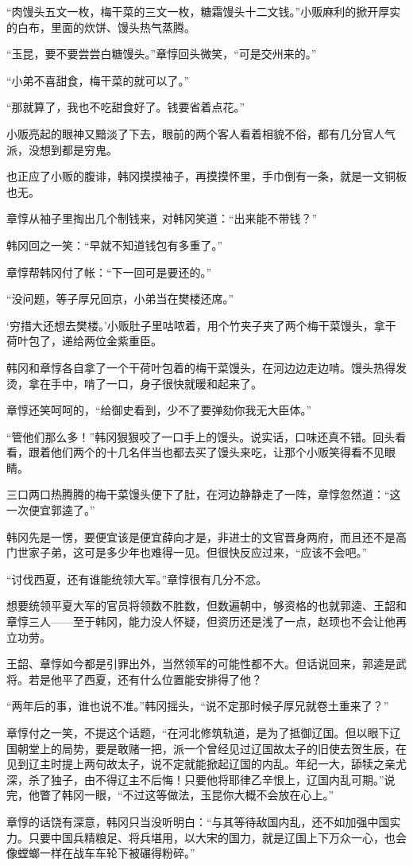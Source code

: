 “肉馒头五文一枚，梅干菜的三文一枚，糖霜馒头十二文钱。”小贩麻利的掀开厚实的白布，里面的炊饼、馒头热气蒸腾。

“玉昆，要不要尝尝白糖馒头。”章惇回头微笑，“可是交州来的。”

“小弟不喜甜食，梅干菜的就可以了。”

“那就算了，我也不吃甜食好了。钱要省着点花。”

小贩亮起的眼神又黯淡了下去，眼前的两个客人看着相貌不俗，都有几分官人气派，没想到都是穷鬼。

也正应了小贩的腹诽，韩冈摸摸袖子，再摸摸怀里，手巾倒有一条，就是一文铜板也无。

章惇从袖子里掏出几个制钱来，对韩冈笑道：“出来能不带钱？”

韩冈回之一笑：“早就不知道钱包有多重了。”

章惇帮韩冈付了帐：“下一回可是要还的。”

“没问题，等子厚兄回京，小弟当在樊楼还席。”

‘穷措大还想去樊楼。’小贩肚子里咕哝着，用个竹夹子夹了两个梅干菜馒头，拿干荷叶包了，递给两位金紫重臣。

韩冈和章惇各自拿了一个干荷叶包着的梅干菜馒头，在河边边走边啃。馒头热得发烫，拿在手中，啃了一口，身子很快就暖和起来了。

章惇还笑呵呵的，“给御史看到，少不了要弹劾你我无大臣体。”

“管他们那么多！”韩冈狠狠咬了一口手上的馒头。说实话，口味还真不错。回头看看，跟着他们两个的十几名伴当也都去买了馒头来吃，让那个小贩笑得看不见眼睛。

三口两口热腾腾的梅干菜馒头便下了肚，在河边静静走了一阵，章惇忽然道：“这一次便宜郭逵了。”

韩冈先是一愣，要便宜该是便宜薛向才是，非进士的文官晋身两府，而且还不是高门世家子弟，这可是多少年也难得一见。但很快反应过来，“应该不会吧。”

“讨伐西夏，还有谁能统领大军。”章惇很有几分不忿。

想要统领平夏大军的官员将领数不胜数，但数遍朝中，够资格的也就郭逵、王韶和章惇三人——至于韩冈，能力没人怀疑，但资历还是浅了一点，赵顼也不会让他再立功劳。

王韶、章惇如今都是引罪出外，当然领军的可能性都不大。但话说回来，郭逵是武将。若是他平了西夏，还有什么位置能安排得了他？

“两年后的事，谁也说不准。”韩冈摇头，“说不定那时候子厚兄就卷土重来了？”

章惇付之一笑，不提这个话题，“在河北修筑轨道，是为了抵御辽国。但以眼下辽国朝堂上的局势，要是敢赌一把，派一个曾经见过辽国故太子的旧使去贺生辰，在见到辽主时提上两句故太子，说不定就能掀起辽国的内乱。年纪一大，舔犊之亲尤深，杀了独子，由不得辽主不后悔！只要他将耶律乙辛恨上，辽国内乱可期。”说完，他瞥了韩冈一眼，“不过这等做法，玉昆你大概不会放在心上。”

章惇的话饶有深意，韩冈只当没听明白：“与其等待敌国内乱，还不如加强中国实力。只要中国兵精粮足、将兵堪用，以大宋的国力，就是辽国上下万众一心，也会像螳螂一样在战车车轮下被碾得粉碎。”

